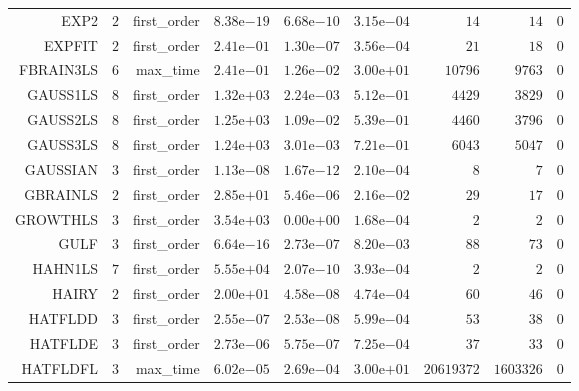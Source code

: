 \begin{longtable}{rrrrrrrrr}
EXP2 & \(     2\) & first\_order & \( 8.38\)e\(-19\) & \( 6.68\)e\(-10\) & \( 3.15\)e\(-04\) & \(    14\) & \(    14\) & \(     0\) \\
EXPFIT & \(     2\) & first\_order & \( 2.41\)e\(-01\) & \( 1.30\)e\(-07\) & \( 3.56\)e\(-04\) & \(    21\) & \(    18\) & \(     0\) \\
FBRAIN3LS & \(     6\) & max\_time & \( 2.41\)e\(-01\) & \( 1.26\)e\(-02\) & \( 3.00\)e\(+01\) & \( 10796\) & \(  9763\) & \(     0\) \\
GAUSS1LS & \(     8\) & first\_order & \( 1.32\)e\(+03\) & \( 2.24\)e\(-03\) & \( 5.12\)e\(-01\) & \(  4429\) & \(  3829\) & \(     0\) \\
GAUSS2LS & \(     8\) & first\_order & \( 1.25\)e\(+03\) & \( 1.09\)e\(-02\) & \( 5.39\)e\(-01\) & \(  4460\) & \(  3796\) & \(     0\) \\
GAUSS3LS & \(     8\) & first\_order & \( 1.24\)e\(+03\) & \( 3.01\)e\(-03\) & \( 7.21\)e\(-01\) & \(  6043\) & \(  5047\) & \(     0\) \\
GAUSSIAN & \(     3\) & first\_order & \( 1.13\)e\(-08\) & \( 1.67\)e\(-12\) & \( 2.10\)e\(-04\) & \(     8\) & \(     7\) & \(     0\) \\
GBRAINLS & \(     2\) & first\_order & \( 2.85\)e\(+01\) & \( 5.46\)e\(-06\) & \( 2.16\)e\(-02\) & \(    29\) & \(    17\) & \(     0\) \\
GROWTHLS & \(     3\) & first\_order & \( 3.54\)e\(+03\) & \( 0.00\)e\(+00\) & \( 1.68\)e\(-04\) & \(     2\) & \(     2\) & \(     0\) \\
GULF & \(     3\) & first\_order & \( 6.64\)e\(-16\) & \( 2.73\)e\(-07\) & \( 8.20\)e\(-03\) & \(    88\) & \(    73\) & \(     0\) \\
HAHN1LS & \(     7\) & first\_order & \( 5.55\)e\(+04\) & \( 2.07\)e\(-10\) & \( 3.93\)e\(-04\) & \(     2\) & \(     2\) & \(     0\) \\
HAIRY & \(     2\) & first\_order & \( 2.00\)e\(+01\) & \( 4.58\)e\(-08\) & \( 4.74\)e\(-04\) & \(    60\) & \(    46\) & \(     0\) \\
HATFLDD & \(     3\) & first\_order & \( 2.55\)e\(-07\) & \( 2.53\)e\(-08\) & \( 5.99\)e\(-04\) & \(    53\) & \(    38\) & \(     0\) \\
HATFLDE & \(     3\) & first\_order & \( 2.73\)e\(-06\) & \( 5.75\)e\(-07\) & \( 7.25\)e\(-04\) & \(    37\) & \(    33\) & \(     0\) \\
HATFLDFL & \(     3\) & max\_time & \( 6.02\)e\(-05\) & \( 2.69\)e\(-04\) & \( 3.00\)e\(+01\) & \(20619372\) & \(1603326\) & \(     0\) \\

\end{longtable}
